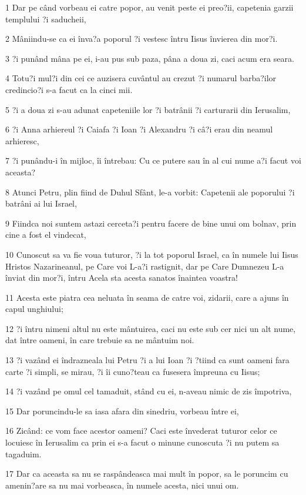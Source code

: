 \par 1 Dar pe când vorbeau ei catre popor, au venit peste ei preo?ii, capetenia garzii templului ?i saducheii,
\par 2 Mâniindu-se ca ei înva?a poporul ?i vestesc întru Iisus învierea din mor?i.
\par 3 ?i punând mâna pe ei, i-au pus sub paza, pâna a doua zi, caci acum era seara.
\par 4 Totu?i mul?i din cei ce auzisera cuvântul au crezut ?i numarul barba?ilor credincio?i s-a facut ca la cinci mii.
\par 5 ?i a doua zi s-au adunat capeteniile lor ?i batrânii ?i carturarii din Ierusalim,
\par 6 ?i Anna arhiereul ?i Caiafa ?i Ioan ?i Alexandru ?i câ?i erau din neamul arhieresc,
\par 7 ?i punându-i în mijloc, îi întrebau: Cu ce putere sau în al cui nume a?i facut voi aceasta?
\par 8 Atunci Petru, plin fiind de Duhul Sfânt, le-a vorbit: Capetenii ale poporului ?i batrâni ai lui Israel,
\par 9 Fiindca noi suntem astazi cerceta?i pentru facere de bine unui om bolnav, prin cine a fost el vindecat,
\par 10 Cunoscut sa va fie voua tuturor, ?i la tot poporul Israel, ca în numele lui Iisus Hristos Nazarineanul, pe Care voi L-a?i rastignit, dar pe Care Dumnezeu L-a înviat din mor?i, întru Acela sta acesta sanatos înaintea voastra!
\par 11 Acesta este piatra cea neluata în seama de catre voi, zidarii, care a ajuns în capul unghiului;
\par 12 ?i întru nimeni altul nu este mântuirea, caci nu este sub cer nici un alt nume, dat între oameni, în care trebuie sa ne mântuim noi.
\par 13 ?i vazând ei îndrazneala lui Petru ?i a lui Ioan ?i ?tiind ca sunt oameni fara carte ?i simpli, se mirau, ?i îi cuno?teau ca fusesera împreuna cu Iisus;
\par 14 ?i vazând pe omul cel tamaduit, stând cu ei, n-aveau nimic de zis împotriva,
\par 15 Dar poruncindu-le sa iasa afara din sinedriu, vorbeau între ei,
\par 16 Zicând: ce vom face acestor oameni? Caci este învederat tuturor celor ce locuiesc în Ierusalim ca prin ei s-a facut o minune cunoscuta ?i nu putem sa tagaduim.
\par 17 Dar ca aceasta sa nu se raspândeasca mai mult în popor, sa le poruncim cu amenin?are sa nu mai vorbeasca, în numele acesta, nici unui om.
